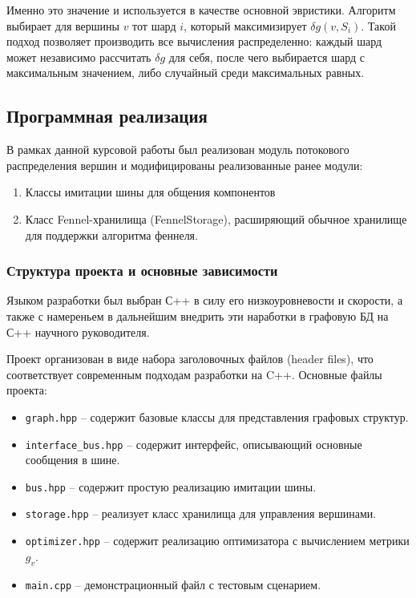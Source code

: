 Именно это значение и используется в качестве основной эвристики. Алгоритм выбирает для вершины \(v\) тот шард \(i\), который максимизирует \(\delta g(v, S_i)\). Такой подход позволяет производить все вычисления распределенно: каждый шард может независимо рассчитать \(\delta g\) для себя, после чего выбирается шард с максимальным значением, либо случайный среди максимальных равных.

\subsection{Программная реализация}

В рамках данной курсовой работы был реализован модуль потокового распределения вершин и модифицированы реализованные ранее модули:
\begin{enumerate}
    \item Классы имитации шины для общения компонентов
    \item Класс Fennel-хранилища (FennelStorage), расширяющий обычное хранилище для поддержки алгоритма феннеля.
\end{enumerate}

\subsubsection{Структура проекта и основные зависимости}

Языком разработки был выбран С++ в силу его низкоуровневости и скорости, а также с намереньем в дальнейшим внедрить эти наработки в графовую БД на С++ научного руководителя.

Проект организован в виде набора заголовочных файлов (header files), что соответствует современным подходам разработки на C++. Основные файлы проекта:

\begin{itemize}
    \item \texttt{graph.hpp} -- содержит базовые классы для представления графовых структур.
    \item \texttt{interface\_bus.hpp} -- содержит интерфейс, описывающий основные сообщения в шине.
    \item \texttt{bus.hpp} -- содержит простую реализацию имитации шины.
    \item \texttt{storage.hpp} -- реализует класс хранилища для управления вершинами.
    \item \texttt{optimizer.hpp} -- содержит реализацию оптимизатора с вычислением метрики $g_v$.
    \item \texttt{main.cpp} -- демонстрационный файл с тестовым сценарием.
\end{itemize}

